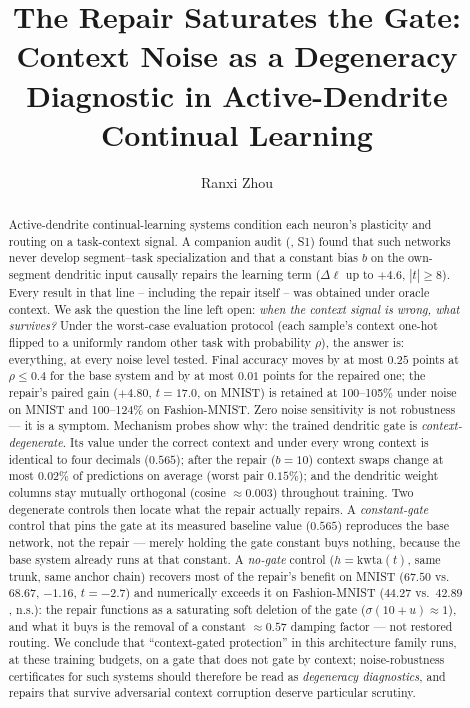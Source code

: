 \documentclass[review,12pt,number]{elsarticle}
\begin{document}
\begin{frontmatter}

\title{The Repair Saturates the Gate: Context Noise as a Degeneracy
Diagnostic in Active-Dendrite Continual Learning}

\author[hnucm]{Ranxi Zhou}

\begin{abstract}
Active-dendrite continual-learning systems condition each neuron's
plasticity and routing on a task-context signal. A companion audit
(\cite{zhou2026delpS1}, S1) found that such networks never develop
segment--task specialization and that a constant bias $b$ on the
own-segment dendritic input causally repairs the learning term
($\Delta\ell$ up to $+4.6$, $|t| \ge 8$). Every result in that line --
including the repair itself -- was obtained under oracle context. We ask
the question the line left open: \emph{when the context signal is wrong,
what survives?} Under the worst-case evaluation protocol (each sample's
context one-hot flipped to a uniformly random other task with probability
$\rho$), the answer is: everything, at every noise level tested.
Final accuracy moves by at most $0.25$ points at $\rho \le 0.4$ for the
base system and by at most $0.01$ points for the repaired one; the
repair's paired gain ($+4.80$, $t{=}17.0$, on MNIST) is retained at
100--105\% under noise on MNIST and 100--124\% on Fashion-MNIST. Zero
noise sensitivity is not robustness --- it is a symptom. Mechanism
probes show why: the trained dendritic gate is \emph{context-degenerate}.
Its value under the correct context and under every wrong context is
identical to four decimals ($0.565$); after the repair ($b{=}10$)
context swaps change at most $0.02\%$ of predictions on average (worst
pair $0.15\%$); and the dendritic weight columns stay mutually
orthogonal (cosine $\approx 0.003$) throughout training. Two degenerate
controls then locate what the repair actually repairs. A
\emph{constant-gate} control that pins the gate at its measured baseline
value ($0.565$) reproduces the base network, not the repair --- merely
holding the gate constant buys nothing, because the base system already
runs at that constant. A \emph{no-gate} control ($h = \mathrm{kwta}(t)$,
same trunk, same anchor chain) recovers most of the repair's benefit on
MNIST ($67.50$ vs.\ $68.67$, $-1.16$, $t{=}-2.7$) and numerically
exceeds it on Fashion-MNIST ($44.27$ vs.\ $42.89$, n.s.): the repair
functions as a saturating soft deletion of the gate ($\sigma(10{+}u)
\approx 1$), and what it buys is the removal of a constant
${\approx}0.57$ damping factor --- not restored routing. We conclude
that ``context-gated protection'' in this architecture family runs, at
these training budgets, on a gate that does not gate by context;
noise-robustness certificates for such systems should therefore be read
as \emph{degeneracy diagnostics}, and repairs that survive adversarial
context corruption deserve particular scrutiny.
\end{abstract}


\end{frontmatter}
\end{document}
